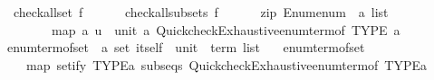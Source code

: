 \begin{isabellebody}
\isanewline
\isanewline
{}\isamarkupfalse%
\isanewline
\ \ {\isachardoublequoteopen}check{\isacharunderscore}{\kern0pt}all{\isacharunderscore}{\kern0pt}set\ f\ {\isacharequal}{\kern0pt}\isanewline
\ \ \ \ \ check{\isacharunderscore}{\kern0pt}all{\isacharunderscore}{\kern0pt}subsets\ f\isanewline
\ \ \ \ \ \ {\isacharparenleft}{\kern0pt}zip\ {\isacharparenleft}{\kern0pt}Enum{\isachardot}{\kern0pt}enum\ {\isacharcolon}{\kern0pt}{\isacharcolon}{\kern0pt}\ {\isacharprime}{\kern0pt}a\ list{\isacharparenright}{\kern0pt}\isanewline
\ \ \ \ \ \ \ \ {\isacharparenleft}{\kern0pt}map\ {\isacharparenleft}{\kern0pt}{\isasymlambda}a{\isachardot}{\kern0pt}\ {\isasymlambda}u\ {\isacharcolon}{\kern0pt}{\isacharcolon}{\kern0pt}\ unit{\isachardot}{\kern0pt}\ a{\isacharparenright}{\kern0pt}\ {\isacharparenleft}{\kern0pt}Quickcheck{\isacharunderscore}{\kern0pt}Exhaustive{\isachardot}{\kern0pt}enum{\isacharunderscore}{\kern0pt}term{\isacharunderscore}{\kern0pt}of\ {\isacharparenleft}{\kern0pt}TYPE\ {\isacharparenleft}{\kern0pt}{\isacharprime}{\kern0pt}a{\isacharparenright}{\kern0pt}{\isacharparenright}{\kern0pt}\ {\isacharparenleft}{\kern0pt}{\isacharparenright}{\kern0pt}{\isacharparenright}{\kern0pt}{\isacharparenright}{\kern0pt}{\isacharparenright}{\kern0pt}{\isachardoublequoteclose}\isanewline
\isanewline
{}\isamarkupfalse%
\ enum{\isacharunderscore}{\kern0pt}term{\isacharunderscore}{\kern0pt}of{\isacharunderscore}{\kern0pt}set\ {\isacharcolon}{\kern0pt}{\isacharcolon}{\kern0pt}\ {\isachardoublequoteopen}{\isacharprime}{\kern0pt}a\ set\ itself\ {\isasymRightarrow}\ unit\ {\isasymRightarrow}\ term\ list{\isachardoublequoteclose}\isanewline
\ \ \ {\isachardoublequoteopen}enum{\isacharunderscore}{\kern0pt}term{\isacharunderscore}{\kern0pt}of{\isacharunderscore}{\kern0pt}set\ {\isacharunderscore}{\kern0pt}\ {\isacharunderscore}{\kern0pt}\ {\isacharequal}{\kern0pt}\isanewline
\ \ \ \ map\ {\isacharparenleft}{\kern0pt}setify\ {\isacharparenleft}{\kern0pt}TYPE{\isacharparenleft}{\kern0pt}{\isacharprime}{\kern0pt}a{\isacharparenright}{\kern0pt}{\isacharparenright}{\kern0pt}{\isacharparenright}{\kern0pt}\ {\isacharparenleft}{\kern0pt}subseqs\ {\isacharparenleft}{\kern0pt}Quickcheck{\isacharunderscore}{\kern0pt}Exhaustive{\isachardot}{\kern0pt}enum{\isacharunderscore}{\kern0pt}term{\isacharunderscore}{\kern0pt}of\ {\isacharparenleft}{\kern0pt}TYPE{\isacharparenleft}{\kern0pt}{\isacharprime}{\kern0pt}a{\isacharparenright}{\kern0pt}{\isacharparenright}{\kern0pt}\ {\isacharparenleft}{\kern0pt}{\isacharparenright}{\kern0pt}{\isacharparenright}{\kern0pt}{\isacharparenright}{\kern0pt}{\isachardoublequoteclose}\isanewline

\end{isabellebody}
